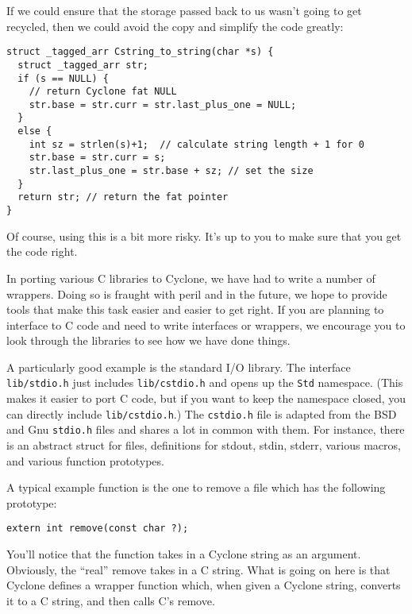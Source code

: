 If we could ensure that the storage passed back to us wasn't
going to get recycled, then we could avoid the copy and simplify
the code greatly:
\begin{verbatim}
struct _tagged_arr Cstring_to_string(char *s) {
  struct _tagged_arr str;
  if (s == NULL) {
    // return Cyclone fat NULL
    str.base = str.curr = str.last_plus_one = NULL;
  }
  else {
    int sz = strlen(s)+1;  // calculate string length + 1 for 0
    str.base = str.curr = s; 
    str.last_plus_one = str.base + sz; // set the size
  }
  return str; // return the fat pointer
}
\end{verbatim}
Of course, using this is a bit more risky.  It's up to you
to make sure that you get the code right.

In porting various C libraries to Cyclone, we have had to write
a number of wrappers.  Doing so is fraught with peril and in the
future, we hope to provide tools that make this task easier
and easier to get right.  If you are planning to interface to
C code and need to write interfaces or wrappers, we encourage
you to look through the libraries to see how we have done
things.  

A particularly good example is the standard I/O library.  The
interface \texttt{lib/stdio.h} just includes \texttt{lib/cstdio.h}
and opens up the \texttt{Std} namespace.  (This makes it easier
to port C code, but if you want to keep the namespace closed,
you can directly include \texttt{lib/cstdio.h}.)  The \texttt{cstdio.h}
file is adapted from the BSD and Gnu \texttt{stdio.h} files
and shares a lot in common with them.  For instance, there
is an abstract struct for files, definitions for stdout, stdin,
stderr, various macros, and various function prototypes.

A typical example function is the one to remove a file which
has the following prototype:
\begin{verbatim}
extern int remove(const char ?);
\end{verbatim}
You'll notice that the function takes in a Cyclone string
as an argument.  Obviously, the ``real'' remove takes in a
C string.  What is going on here is that Cyclone defines
a wrapper function which, when given a Cyclone string,
converts it to a C string, and then calls C's remove. 

